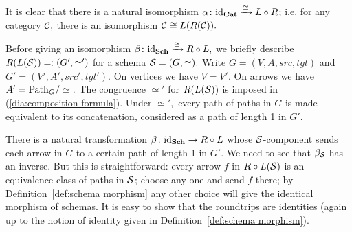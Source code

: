 \documentclass[CT4S-EN-RU]{subfiles}
\begin{document}
\begin{proofENG}
It is clear that there is a natural isomorphism $\alpha\colon\textnormal{id}_{\mathbf{Cat}}\xrightarrow{\cong} L\circ R$; i.e. for any category $\mathcal{C},$ there is an isomorphism $\mathcal{C}\cong L(R(\mathcal{C})).$ 

Before giving an isomorphism $\beta\colon\textnormal{id}_{\mathbf{Sch}}\xrightarrow{\cong}R\circ L,$ we briefly describe $R(L(\mathcal{S}))=:(G',\simeq')$ for a schema $\mathcal{S}=(G,\simeq).$ Write $G=(V,A,src,tgt)$ and $G'=(V',A',src',tgt').$ On vertices we have $V=V'.$ On arrows we have $A'=\textnormal{Path}_G/\simeq.$ The congruence $\simeq'$ for $R(L(\mathcal{S}))$ is imposed in (\ref{dia:composition formula}). Under $\simeq',$ every path of paths in $G$ is made equivalent to its concatenation, considered as a path of length 1 in $G'.$ 

There is a natural transformation $\beta\colon\textnormal{id}_{\mathbf{Sch}}\rightarrow R\circ L$ whose $\mathcal{S}$-component sends each arrow in $G$ to a certain path of length 1 in $G'.$ We need to see that $\beta_\mathcal{S}$ has an inverse. But this is straightforward: every arrow $f$ in $R\circ L(\mathcal{S})$ is an  equivalence class of paths in $\mathcal{S}$; choose any one and send $f$ there; by Definition~\ref{def:schema morphism} any other choice will give the identical morphism of schemas. It is easy to show that the roundtrips are identities (again up to the notion of identity given in Definition~\ref{def:schema morphism}).
\end{proofENG}

\begin{proofRUS}
\end{proofRUS}
\end{document}
